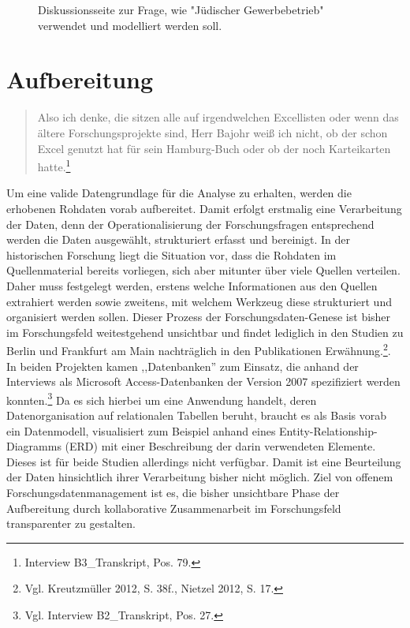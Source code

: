 \begin{figure}[h]
    \centering
    \caption{Diskussionsseite zur Frage, wie "Jüdischer Gewerbebetrieb" verwendet und modelliert werden soll.}
    \label{fig:x cubed graph}
\end{figure}

\section{Aufbereitung}

\begin{quote}
    Also ich denke, die sitzen alle auf irgendwelchen Excellisten oder wenn das ältere Forschungsprojekte sind, Herr Bajohr weiß ich nicht, ob der schon Excel genutzt hat für sein Hamburg-Buch oder ob der noch Karteikarten hatte.\footnote{Interview B3\_Transkript, Pos. 79.}
\end{quote}

Um eine valide Datengrundlage für die Analyse zu erhalten, werden die erhobenen Rohdaten vorab aufbereitet. Damit erfolgt erstmalig eine Verarbeitung der Daten, denn der Operationalisierung der Forschungsfragen entsprechend werden die Daten ausgewählt, strukturiert erfasst und bereinigt. In der historischen Forschung liegt die Situation vor, dass die Rohdaten im Quellenmaterial bereits vorliegen, sich aber mitunter über viele Quellen verteilen. Daher muss festgelegt werden, erstens welche Informationen aus den Quellen extrahiert werden sowie zweitens, mit welchem Werkzeug diese strukturiert und organisiert werden sollen. Dieser Prozess der Forschungsdaten-Genese ist bisher im Forschungsfeld weitestgehend unsichtbar und findet lediglich in den Studien zu Berlin und Frankfurt am Main nachträglich in den Publikationen Erwähnung.\footnote{Vgl. Kreutzmüller 2012, S. 38f., Nietzel 2012, S. 17.}. In beiden Projekten kamen ,,Datenbanken'' zum Einsatz, die anhand der Interviews als Microsoft Access-Datenbanken der Version 2007 spezifiziert werden konnten.\footnote{Vgl. Interview B2\_Transkript, Pos. 27.} Da es sich hierbei um eine Anwendung handelt, deren Datenorganisation auf relationalen Tabellen beruht, braucht es als Basis vorab ein Datenmodell, visualisiert zum Beispiel anhand eines Entity-Relationship-Diagramms (ERD) mit einer Beschreibung der darin verwendeten Elemente. Dieses ist für beide Studien allerdings nicht verfügbar. Damit ist eine Beurteilung der Daten hinsichtlich ihrer Verarbeitung bisher nicht möglich. Ziel von offenem Forschungsdatenmanagement ist es, die bisher unsichtbare Phase der Aufbereitung durch kollaborative Zusammenarbeit im Forschungsfeld transparenter zu gestalten. 


